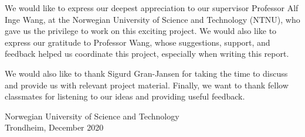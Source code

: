 \documentclass[../Main.tex]{subfiles}
\begin{document}
\vspace*{2\baselineskip}

We would like to express our deepest appreciation to our supervisor Professor Alf Inge Wang, at the Norwegian University of Science and Technology (NTNU), who gave us the privilege to work on this exciting project. We would also like to express our gratitude to Professor Wang, whose suggestions, support, and feedback helped us coordinate this project, especially when writing this report.

We would also like to thank Sigurd Gran-Jansen for taking the time to discuss and provide us with relevant project material. Finally, we want to thank fellow classmates for listening to our ideas and providing useful feedback.



\vspace*{6\baselineskip}

\center Norwegian University of Science and Technology\\

\center Trondheim, December 2020
\vspace*{3\baselineskip}


\makeatletter
\newcommand*{\textoverline}[1]{$\overline{\hbox{#1}}\m@th$}
\makeatother

\makebox[2.5in]{\hrulefill}  \qquad \qquad \qquad \makebox[2.5in]{\hrulefill}

 \qquad \qquad \qquad  {}
\end{document}
